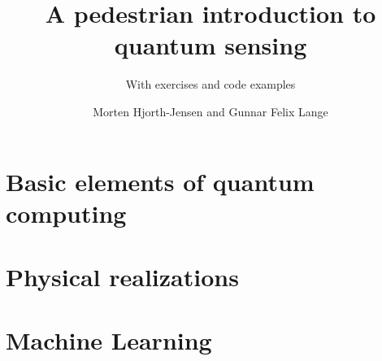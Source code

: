 \documentclass[graybox,envcountchap,sectrefs]{svmono}
\begin{document}
\author{Morten Hjorth-Jensen and Gunnar Felix Lange}
\title{A pedestrian  introduction to quantum sensing}
\subtitle{With exercises and code examples}
\maketitle

\frontmatter%






\tableofcontents




\mainmatter%
 \part{Basic elements of quantum computing}
         
 \clearemptydoublepage
         
 \clearemptydoublepage
      
 \part{Physical realizations}
\clearemptydoublepage
      
\clearemptydoublepage

\clearemptydoublepage

\part{Machine Learning}



 

\backmatter%
%
%
\printindex
\end{document}
